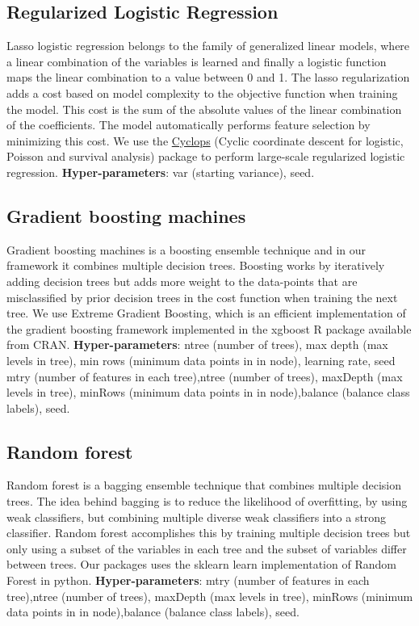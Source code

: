 \documentclass[11pt]{book}
\theoremstyle{definition}
\theoremstyle{definition}
\theoremstyle{definition}
\theoremstyle{remark}
\begin{document}
\hypertarget{regularized-logistic-regression}{%
\subsection{Regularized Logistic Regression}\label{regularized-logistic-regression}}

Lasso logistic regression belongs to the family of generalized linear models, where a linear combination of the variables is learned and finally a logistic function maps the linear combination to a value between 0 and 1. The lasso regularization adds a cost based on model complexity to the objective function when training the model. This cost is the sum of the absolute values of the linear combination of the coefficients. The model automatically performs feature selection by minimizing this cost. We use the \href{https://ohdsi.github.io/Cyclops/}{Cyclops} (Cyclic coordinate descent for logistic, Poisson and survival analysis) package to perform large-scale regularized logistic regression. \textbf{Hyper-parameters}: var (starting variance), seed.

\hypertarget{gradient-boosting-machines}{%
\subsection{Gradient boosting machines}\label{gradient-boosting-machines}}

Gradient boosting machines is a boosting ensemble technique and in our framework it combines multiple decision trees. Boosting works by iteratively adding decision trees but adds more weight to the data-points that are misclassified by prior decision trees in the cost function when training the next tree. We use Extreme Gradient Boosting, which is an efficient implementation of the gradient boosting framework implemented in the xgboost R package available from CRAN. \textbf{Hyper-parameters}: ntree (number of trees), max depth (max levels in tree), min rows (minimum data points in in node), learning rate, seed \textbar{} mtry (number of features in each tree),ntree (number of trees), maxDepth (max levels in tree), minRows (minimum data points in in node),balance (balance class labels), seed.

\hypertarget{random-forest}{%
\subsection{Random forest}\label{random-forest}}

Random forest is a bagging ensemble technique that combines multiple decision trees. The idea behind bagging is to reduce the likelihood of overfitting, by using weak classifiers, but combining multiple diverse weak classifiers into a strong classifier. Random forest accomplishes this by training multiple decision trees but only using a subset of the variables in each tree and the subset of variables differ between trees. Our packages uses the sklearn learn implementation of Random Forest in python. \textbf{Hyper-parameters}: mtry (number of features in each tree),ntree (number of trees), maxDepth (max levels in tree), minRows (minimum data points in in node),balance (balance class labels), seed.
\end{document}
